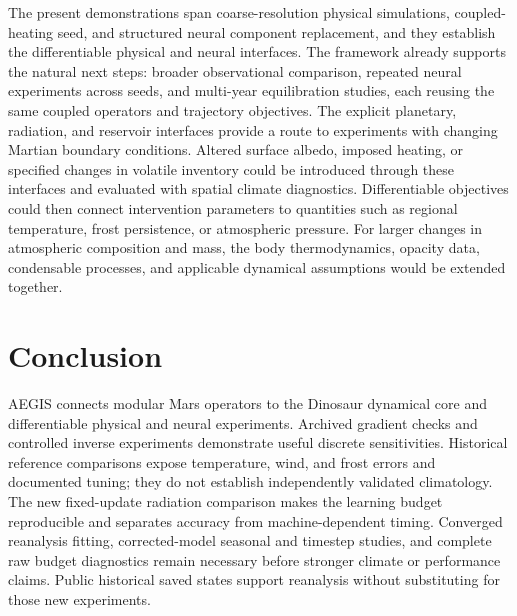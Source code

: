 \documentclass{article} %
\begin{document}
The present demonstrations span coarse-resolution physical simulations, coupled-heating seed, and structured neural component replacement, and they establish the differentiable physical and neural interfaces. The framework already supports the natural next steps: broader observational comparison, repeated neural experiments across seeds, and multi-year equilibration studies, each reusing the same coupled operators and trajectory objectives. The explicit planetary, radiation, and reservoir interfaces provide a route to experiments with changing Martian boundary conditions. Altered surface albedo, imposed heating, or specified changes in volatile inventory could be introduced through these interfaces and evaluated    with spatial climate diagnostics. Differentiable objectives could then connect intervention parameters to quantities such as regional temperature, frost persistence, or atmospheric pressure. For larger changes in atmospheric composition and mass, the body thermodynamics, opacity data, condensable processes, and applicable dynamical assumptions would be extended together.


\section{Conclusion}
AEGIS connects modular Mars operators to the Dinosaur dynamical core and differentiable physical and neural experiments. Archived gradient checks and controlled inverse experiments demonstrate useful discrete sensitivities. Historical reference comparisons expose temperature, wind, and frost errors and documented tuning; they do not establish independently validated climatology. The new fixed-update radiation comparison makes the learning budget reproducible and separates accuracy from machine-dependent timing. Converged reanalysis fitting, corrected-model seasonal and timestep studies, and complete raw budget diagnostics remain necessary before stronger climate or performance claims. Public historical saved states support reanalysis without substituting for those new experiments.
\end{document}

